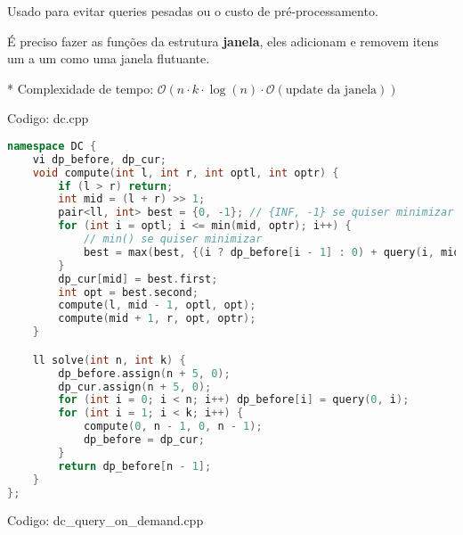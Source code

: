 \documentclass[10pt, a4paper, oneside]{book}
\begin{document}
Usado para evitar queries pesadas ou o custo de pré-processamento.  

É preciso fazer as funções da estrutura \textbf{janela}, eles adicionam e removem itens um a um como uma janela flutuante.



* Complexidade de tempo: $\mathcal{O}(n \cdot k \cdot \log(n) \cdot \mathcal{O}(\text{update da janela}))$
\hfill

Codigo: dc.cpp

\begin{lstlisting}[language=C++]
namespace DC {
    vi dp_before, dp_cur;
    void compute(int l, int r, int optl, int optr) {
        if (l > r) return;
        int mid = (l + r) >> 1;
        pair<ll, int> best = {0, -1}; // {INF, -1} se quiser minimizar
        for (int i = optl; i <= min(mid, optr); i++) {
            // min() se quiser minimizar
            best = max(best, {(i ? dp_before[i - 1] : 0) + query(i, mid), i});
        }
        dp_cur[mid] = best.first;
        int opt = best.second;
        compute(l, mid - 1, optl, opt);
        compute(mid + 1, r, opt, optr);
    }

    ll solve(int n, int k) {
        dp_before.assign(n + 5, 0);
        dp_cur.assign(n + 5, 0);
        for (int i = 0; i < n; i++) dp_before[i] = query(0, i);
        for (int i = 1; i < k; i++) {
            compute(0, n - 1, 0, n - 1);
            dp_before = dp_cur;
        }
        return dp_before[n - 1];
    }
};
\end{lstlisting}
\hfill

Codigo: dc\_query\_on\_demand.cpp
\end{document}

